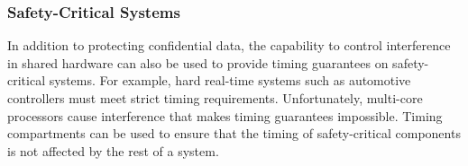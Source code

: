\subsubsection{Safety-Critical Systems}

In addition to protecting confidential data, the capability to control 
interference in shared hardware can also be used to provide timing guarantees on 
safety-critical systems. For example, hard real-time systems such as automotive 
controllers must meet strict timing requirements. Unfortunately, multi-core
processors cause interference that makes timing guarantees impossible. Timing
compartments can be used to ensure that the timing of safety-critical components 
is not affected by the rest of a system.

